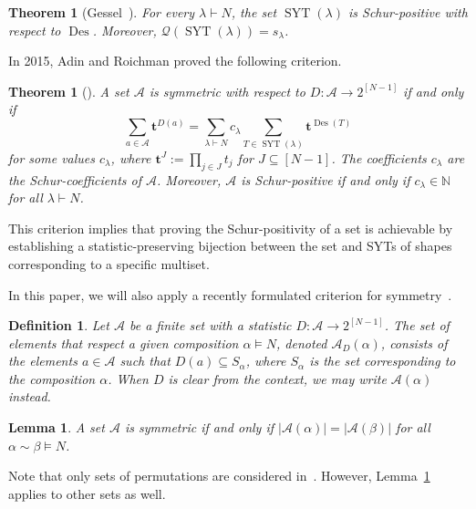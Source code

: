 \documentclass[11pt]{article}
\newtheorem{definition}[theo]{Definition}
\newtheorem{theorem}[theo]{Theorem}
\newtheorem{lemma}[theo]{Lemma}
\theoremstyle{definition}
\numberwithin{equation}{section}
\newcommand{\Des}{\operatorname{Des}}
\newcommand{\Syt}{\operatorname{SYT}}
\newcommand{\NN}{\mathbb{N}}
\newcommand{\Q}{\mathcal{Q}}
\newcommand{\A}{\mathcal{A}}
\begin{document}
\begin{theorem}[Gessel~\cite{knuth_classes_schur_positive}]
\label{thm:schur functions young tableaux}
    For every $\lambda \vdash N$, the set $\Syt(\lambda)$ is Schur-positive with respect to $\Des$. Moreover, $\Q(\Syt(\lambda)) = s_\lambda$.
\end{theorem}

In 2015, Adin and Roichman proved the following criterion.
\begin{theorem}[{\cite[Prop.\ 9.1]{adin_roichman_fine_set}}]
\label{thm:criterion schur positive young}
    A set $\A$ is symmetric with respect to $D:\A\to 2^{[N-1]}$ if and only if
    \[
        \sum_{a \in \A} \boldsymbol{t}^{D(a)} = \sum_{\lambda \vdash N} c_\lambda \sum_{T \in \Syt(\lambda)} \boldsymbol{t}^{\Des(T)}
    \]
    for some values $c_\lambda$, where $\boldsymbol{t}^J := \prod_{j \in J} t_j$ for $J \subseteq [N-1]$. The coefficients $c_\lambda$ are the Schur-coefficients of $\A$. Moreover, $\A$ is Schur-positive if and only if $c_{\lambda} \in \NN$ for all $\lambda \vdash N$.
\end{theorem}

This criterion implies that proving the Schur-positivity of a set is achievable by establishing a statistic-preserving bijection between the set and SYTs of shapes corresponding to a specific multiset.

In this paper, we will also apply a recently formulated criterion for symmetry~\cite{my_pattern_theorem}.
\begin{definition}
\label{def:respect composition}
    Let $\A$ be a finite set with a statistic $D:\A \to 2^{[N-1]}$. The set of elements that \emph{respect} a given composition $\alpha \vDash N$, denoted $\A_D(\alpha)$, consists of the elements $a \in \A$ such that $D(a) \subseteq S_\alpha$, where $S_\alpha$ is the set corresponding to the composition $\alpha$. When $D$ is clear from the context, we may write $\A(\alpha)$ instead.
\end{definition}

\begin{lemma}
\label{lem:my symmetry criterion}
    A set $\A$ is symmetric if and only if $|\A(\alpha)| = |\A(\beta)|$ for all $\alpha \sim \beta \vDash N$.
\end{lemma}

Note that only sets of permutations are considered in~\cite{my_pattern_theorem}. However, Lemma~\ref{lem:my symmetry criterion} applies to other sets as well.
\end{document}
